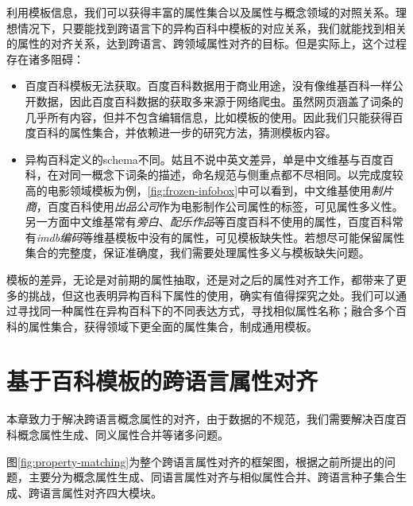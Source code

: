利用模板信息，我们可以获得丰富的属性集合以及属性与概念领域的对照关系。理想情况下，只要能找到跨语言下的异构百科中模板的对应关系，我们就能找到相关的属性的对齐关系，达到跨语言、跨领域属性对齐的目标。但是实际上，这个过程存在诸多阻碍：
\begin{itemize}
\item 百度百科模板无法获取。百度百科数据用于商业用途，没有像维基百科一样公开数据，因此百度百科数据的获取多来源于网络爬虫。虽然网页涵盖了词条的几乎所有内容，但并不包含编辑信息，比如模板的使用。因此我们只能获得百度百科的属性集合，并依赖进一步的研究方法，猜测模板内容。
\item 异构百科定义的schema不同。姑且不说中英文差异，单是中文维基与百度百科，在对同一概念下词条的描述，命名规范与侧重点都不尽相同。以完成度较高的电影领域模板为例，\ref{fig:frozen-infobox}中可以看到，中文维基使用\textit{制片商}，百度百科使用\textit{出品公司}作为电影制作公司属性的标签，可见{\heiti 属性多义性}。另一方面中文维基常有\textit{旁白}、\textit{配乐作品}等百度百科不使用的属性，百度百科常有\textit{imdb编码}等维基模板中没有的属性，可见{\heiti 模板缺失性}。若想尽可能保留属性集合的完整度，保证准确度，我们需要处理属性多义与模板缺失问题。
\end{itemize}

模板的差异，无论是对前期的属性抽取，还是对之后的属性对齐工作，都带来了更多的挑战，但这也表明异构百科下属性的使用，确实有值得探究之处。我们可以通过寻找同一种属性在异构百科下的不同表达方式，寻找相似属性名称；融合多个百科的属性集合，获得领域下更全面的属性集合，制成通用模板。

\section{基于百科模板的跨语言属性对齐}
\label{sec:property-matching}

本章致力于解决跨语言概念属性的对齐，由于数据的不规范，我们需要解决百度百科概念属性生成、同义属性合并等诸多问题。


图\ref{fig:property-matching}为整个跨语言属性对齐的框架图，根据之前所提出的问题，主要分为概念属性生成、同语言属性对齐与相似属性合并、跨语言种子集合生成、跨语言属性对齐四大模块。

